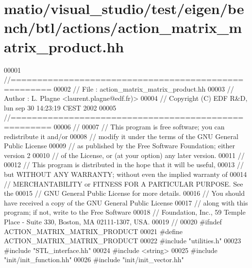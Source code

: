 \hypertarget{matio_2visual__studio_2test_2eigen_2bench_2btl_2actions_2action__matrix__matrix__product_8hh_source}{}\section{matio/visual\+\_\+studio/test/eigen/bench/btl/actions/action\+\_\+matrix\+\_\+matrix\+\_\+product.hh}
\label{matio_2visual__studio_2test_2eigen_2bench_2btl_2actions_2action__matrix__matrix__product_8hh_source}

\begin{DoxyCode}
00001 \textcolor{comment}{//=====================================================}
00002 \textcolor{comment}{// File   :  action\_matrix\_matrix\_product.hh}
00003 \textcolor{comment}{// Author :  L. Plagne <laurent.plagne@edf.fr)>}
00004 \textcolor{comment}{// Copyright (C) EDF R&D,  lun sep 30 14:23:19 CEST 2002}
00005 \textcolor{comment}{//=====================================================}
00006 \textcolor{comment}{//}
00007 \textcolor{comment}{// This program is free software; you can redistribute it and/or}
00008 \textcolor{comment}{// modify it under the terms of the GNU General Public License}
00009 \textcolor{comment}{// as published by the Free Software Foundation; either version 2}
00010 \textcolor{comment}{// of the License, or (at your option) any later version.}
00011 \textcolor{comment}{//}
00012 \textcolor{comment}{// This program is distributed in the hope that it will be useful,}
00013 \textcolor{comment}{// but WITHOUT ANY WARRANTY; without even the implied warranty of}
00014 \textcolor{comment}{// MERCHANTABILITY or FITNESS FOR A PARTICULAR PURPOSE.  See the}
00015 \textcolor{comment}{// GNU General Public License for more details.}
00016 \textcolor{comment}{// You should have received a copy of the GNU General Public License}
00017 \textcolor{comment}{// along with this program; if not, write to the Free Software}
00018 \textcolor{comment}{// Foundation, Inc., 59 Temple Place - Suite 330, Boston, MA  02111-1307, USA.}
00019 \textcolor{comment}{//}
00020 \textcolor{preprocessor}{#ifndef ACTION\_MATRIX\_MATRIX\_PRODUCT}
00021 \textcolor{preprocessor}{#define ACTION\_MATRIX\_MATRIX\_PRODUCT}
00022 \textcolor{preprocessor}{#include "utilities.h"}
00023 \textcolor{preprocessor}{#include "STL\_interface.hh"}
00024 \textcolor{preprocessor}{#include <string>}
00025 \textcolor{preprocessor}{#include "init/init\_function.hh"}
00026 \textcolor{preprocessor}{#include "init/init\_vector.hh"}

\end{DoxyCode}

